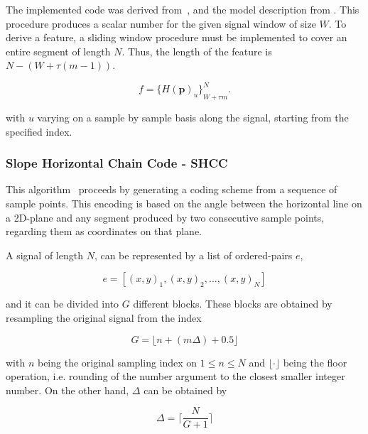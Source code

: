 The implemented code was derived from~\cite{Unakafova2013}, and the model description from \cite{Berger2017}.  This procedure produces a scalar number for the given signal window of size $W$.  To derive a feature, a sliding window procedure must be implemented to cover an entire segment of length $N$.  Thus, the length of the feature is $N - (W + \tau (m - 1))$.

\begin{equation}
f =  {\bigg \{ H(\textbf{p})_{u} \bigg \}}_{W + \tau  m}^{N}.
\label{eq:pe6}
\end{equation}

\noindent with $u$ varying on a sample by sample basis along the signal, starting from the specified index.

\subsubsection{Slope Horizontal Chain Code - SHCC}

This algorithm~\cite{Alvarado-Gonzalez2016} proceeds by generating a coding scheme from a sequence of sample points. This encoding is based on the angle between the horizontal line on a 2D-plane and any segment produced by two consecutive sample points, regarding them as coordinates on that plane.  

A signal of length $N$, can be represented by a list of ordered-pairs $e$,

\begin{equation}
e = \left[ (x,y)_{1}, (x,y)_{2}, ..., (x,y)_{N} \right]
\label{eq:shccdelta}
\end{equation}

\noindent and it can be divided into $G$ different blocks.  These blocks are obtained by resampling the original signal from the index 

\begin{equation}
G = \lfloor n + ( m \Delta ) + 0.5 \rfloor
\label{eq:shcc2}
\end{equation}

\noindent with $n$ being the original sampling index on $ 1 \leq n \leq N $ and $\lfloor \cdot \rfloor$ being the floor operation, i.e. rounding of the number argument to the closest smaller integer number.  On the other hand, $\Delta$ can be obtained by

\begin{equation}
\Delta = \bigg \lceil \frac{N}{G+1} \bigg \rceil
\label{eq:shcc3}
\end{equation}

